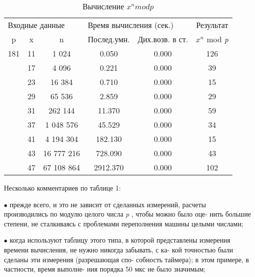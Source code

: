 \newpage
\begin{table}
\centering
\begin{tabular}{|*{6}{c|}}
\hline 
\multicolumn{3}{|l|}{Входные данные} & \multicolumn{2}{l|}{Время вычисления (сек.)} & Результат\\
p & x & n & Послед.умн. & Дих.возв. в ст. & $x^n$ mod {\it p}\\ 
\hline
181 & 11 & 1 024 & 0.050& 0.000& 126\\
 & 17& 4 096& 0.221 & 0.000& 39\\
 & 23 & 16 384 & 0.710 & 0.000& 15\\
 & 29 & 65 536 & 2.859 & 0.000& 29\\
 & 31 & 262 144 & 11.370 & 0.000& 59\\
 & 37 & 1 048 576 & 45.529 & 0.000 & 34\\
 & 41 & 4 194 304 & 182.130 & 0.000 & 15\\
 & 43 & 16 777 216 & 728.090 & 0.000 & 43\\
 & 47 & 67 108 864 & 2912.370 & 0.000 & 102\\
\hline
\end{tabular}
\caption{ Вычисление $x^n mod p$}
\end{table}
Несколько комментариев по таблице 1:

$\bullet$ прежде всего, и это не зависит от сделанных измерений, расчеты\linebreak
\hspace*{24pt}производились по модулю целого числа {\it p} , чтобы можно было оце­-\linebreak
\hspace*{24pt}нить большие степени, не сталкиваясь с проблемами переполнения
\hspace*{24pt}машины целыми числами;

$\bullet$ когда используют таблицу этого типа, в которой представлены\linebreak
\hspace*{24pt}измерения времени вычисления, не нужно никогда забывать, с ка­-\linebreak
\hspace*{24pt}кой точностью были сделаны эти измерения (разрешающая спо­-\linebreak
\hspace*{24pt}собность таймера); в этом примере, в частности, время выполне­-\linebreak
\hspace*{24pt}ния порядка 50 мкс не было значимым;

